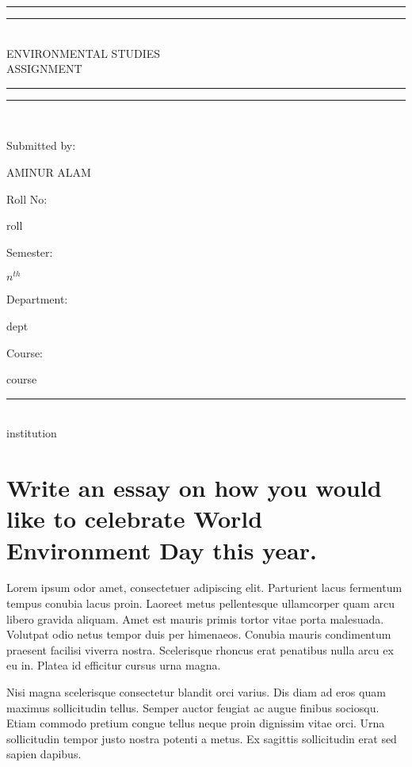 \documentclass[12pt]{article}
\begin{document}
\begin{titlepage}
    \centering
    \vspace*{2\baselineskip}
    \rule{\textwidth}{1.6pt}\vspace*{-\baselineskip}\vspace*{2pt}
    \rule{\textwidth}{0.4pt}\\[\baselineskip]
        {\huge ENVIRONMENTAL STUDIES \\[0.6\baselineskip] ASSIGNMENT}\\[0.3\baselineskip]
    \rule{\textwidth}{0.4pt}\vspace*{-\baselineskip}\vspace{3.2pt}
    \rule{\textwidth}{1.6pt}\\[\baselineskip]
    \scshape
    \vspace*{19\baselineskip}
    \raggedright
    Submitted by: {\Large AMINUR ALAM\par}
    Roll No: {\Large roll\par}
    Semester: {\Large $n^{th}$\par}
    Department: {\Large dept\par}
    Course: {\Large course\par}
    \vfill
    \centering
    \rule{\textwidth}{0.4pt}\\[\baselineskip]
    institution
\end{titlepage}
\restoregeometry

\lhead{}
\chead{}
\rhead{}

\section{Write an essay on how you would like to celebrate World Environment Day this year.}
Lorem ipsum odor amet, consectetuer adipiscing elit. Parturient lacus fermentum tempus conubia lacus proin. Laoreet metus pellentesque ullamcorper quam arcu libero gravida aliquam. Amet est mauris primis tortor vitae porta malesuada. Volutpat odio netus tempor duis per himenaeos. Conubia mauris condimentum praesent facilisi viverra nostra. Scelerisque rhoncus erat penatibus nulla arcu ex eu in. Platea id efficitur cursus urna magna.

Nisi magna scelerisque consectetur blandit orci varius. Dis diam ad eros quam maximus sollicitudin tellus. Semper auctor feugiat ac augue finibus sociosqu. Etiam commodo pretium congue tellus neque proin dignissim vitae orci. Urna sollicitudin tempor justo nostra potenti a metus. Ex sagittis sollicitudin erat sed sapien dapibus.
\end{document}
